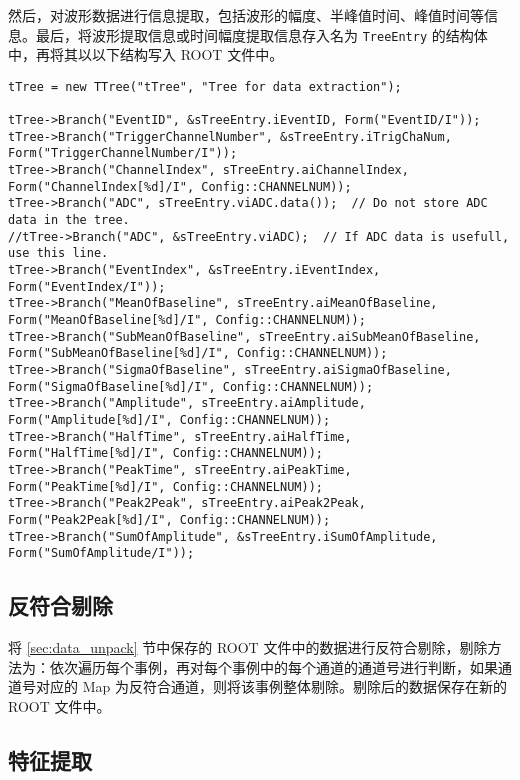 然后，对波形数据进行信息提取，包括波形的幅度、半峰值时间、峰值时间等信息。最后，将波形提取信息或时间幅度提取信息存入名为 \verb|TreeEntry| 的结构体中，再将其以以下结构写入 ROOT 文件中。
\begin{verbatim}
tTree = new TTree("tTree", "Tree for data extraction");

tTree->Branch("EventID", &sTreeEntry.iEventID, Form("EventID/I"));
tTree->Branch("TriggerChannelNumber", &sTreeEntry.iTrigChaNum, Form("TriggerChannelNumber/I"));
tTree->Branch("ChannelIndex", sTreeEntry.aiChannelIndex, Form("ChannelIndex[%d]/I", Config::CHANNELNUM));
tTree->Branch("ADC", sTreeEntry.viADC.data());  // Do not store ADC data in the tree.
//tTree->Branch("ADC", &sTreeEntry.viADC);  // If ADC data is usefull, use this line.
tTree->Branch("EventIndex", &sTreeEntry.iEventIndex, Form("EventIndex/I"));
tTree->Branch("MeanOfBaseline", sTreeEntry.aiMeanOfBaseline, Form("MeanOfBaseline[%d]/I", Config::CHANNELNUM));
tTree->Branch("SubMeanOfBaseline", sTreeEntry.aiSubMeanOfBaseline, Form("SubMeanOfBaseline[%d]/I", Config::CHANNELNUM));
tTree->Branch("SigmaOfBaseline", sTreeEntry.aiSigmaOfBaseline, Form("SigmaOfBaseline[%d]/I", Config::CHANNELNUM));
tTree->Branch("Amplitude", sTreeEntry.aiAmplitude, Form("Amplitude[%d]/I", Config::CHANNELNUM));
tTree->Branch("HalfTime", sTreeEntry.aiHalfTime, Form("HalfTime[%d]/I", Config::CHANNELNUM));
tTree->Branch("PeakTime", sTreeEntry.aiPeakTime, Form("PeakTime[%d]/I", Config::CHANNELNUM));
tTree->Branch("Peak2Peak", sTreeEntry.aiPeak2Peak, Form("Peak2Peak[%d]/I", Config::CHANNELNUM));
tTree->Branch("SumOfAmplitude", &sTreeEntry.iSumOfAmplitude, Form("SumOfAmplitude/I"));
\end{verbatim}

\subsection{反符合剔除}
\label{sec:anti_coincidence}
将 \ref{sec:data_unpack} 节中保存的 ROOT 文件中的数据进行反符合剔除，剔除方法为：依次遍历每个事例，再对每个事例中的每个通道的通道号进行判断，如果通道号对应的 Map 为反符合通道，则将该事例整体剔除。剔除后的数据保存在新的 ROOT 文件中。

\subsection{特征提取}
